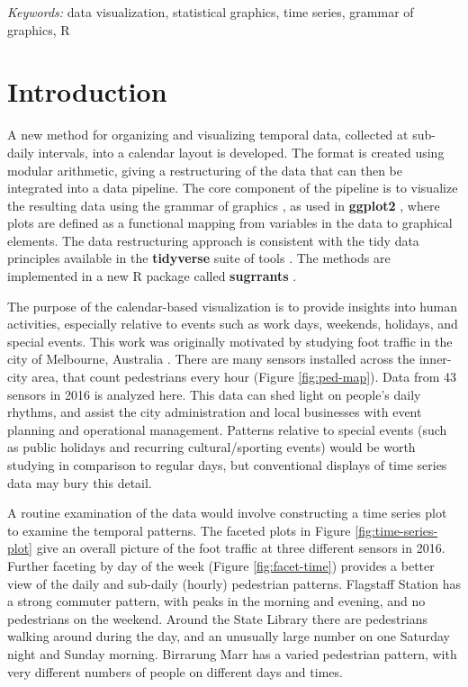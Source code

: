 \documentclass[12pt]{article}
\begin{document}
\noindent%
{\it Keywords:} data visualization, statistical graphics, time series, grammar of graphics, R
\vfill

\newpage
{} %

\hypertarget{introduction}{%
\section{Introduction}\label{introduction}}

A new method for organizing and visualizing temporal data, collected at sub-daily intervals, into a calendar layout is developed. The format is created using modular arithmetic, giving a restructuring of the data that can then be integrated into a data pipeline. The core component of the pipeline is to visualize the resulting data using the grammar of graphics \citep{wilkinson2006grammar, wickham2009ggplot2}, as used in \textbf{ggplot2} \citep{R-ggplot2}, where plots are defined as a functional mapping from variables in the data to graphical elements. The data restructuring approach is consistent with the tidy data principles available in the \textbf{tidyverse} suite of tools \citep{R-tidyverse}. The methods are implemented in a new R package called \textbf{sugrrants} \citep{R-sugrrants}.

The purpose of the calendar-based visualization is to provide insights into human activities, especially relative to events such as work days, weekends, holidays, and special events. This work was originally motivated by studying foot traffic in the city of Melbourne, Australia \citep{ped}. There are many sensors installed across the inner-city area, that count pedestrians every hour (Figure \ref{fig:ped-map}). Data from 43 sensors in 2016 is analyzed here. This data can shed light on people's daily rhythms, and assist the city administration and local businesses with event planning and operational management. Patterns relative to special events (such as public holidays and recurring cultural/sporting events) would be worth studying in comparison to regular days, but conventional displays of time series data may bury this detail.

A routine examination of the data would involve constructing a time series plot to examine the temporal patterns. The faceted plots in Figure \ref{fig:time-series-plot} give an overall picture of the foot traffic at three different sensors in 2016. Further faceting by day of the week (Figure \ref{fig:facet-time}) provides a better view of the daily and sub-daily (hourly) pedestrian patterns. Flagstaff Station has a strong commuter pattern, with peaks in the morning and evening, and no pedestrians on the weekend. Around the State Library there are pedestrians walking around during the day, and an unusually large number on one Saturday night and Sunday morning. Birrarung Marr has a varied pedestrian pattern, with very different numbers of people on different days and times.
\end{document}
